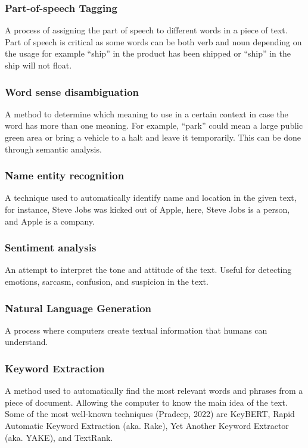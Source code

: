 \documentclass[12pt,oneside,openright,a4paper]{cpe-english-project}
\begin{document}
\subsubsection{Part-of-speech Tagging}
A process of assigning the part of speech to different words in a piece of text. Part of speech is critical as some words can be both verb and noun depending on the usage for example “ship” in the product has been shipped or “ship” in the ship will not float.

\subsubsection{Word sense disambiguation}
A method to determine which meaning to use in a certain context in case the word has more than one meaning. For example, “park” could mean a large public green area or bring a vehicle to a halt and leave it temporarily. This can be done through semantic analysis.

\subsubsection{Name entity recognition}
A technique used to automatically identify name and location in the given text, for instance, Steve Jobs was kicked out of Apple, here, Steve Jobs is a person, and Apple is a company.

\subsubsection{Sentiment analysis}
An attempt to interpret the tone and attitude of the text. Useful for detecting emotions, sarcasm, confusion, and suspicion in the text.

\subsubsection{Natural Language Generation}
A process where computers create textual information that humans can understand.

\subsubsection{Keyword Extraction}
A method used to automatically find the most relevant words and phrases from a piece of document. Allowing the computer to know the main idea of the text. Some of the most well-known techniques (Pradeep, 2022) are KeyBERT, Rapid Automatic Keyword Extraction (aka. Rake), Yet Another Keyword Extractor (aka. YAKE), and TextRank.
\end{document}
